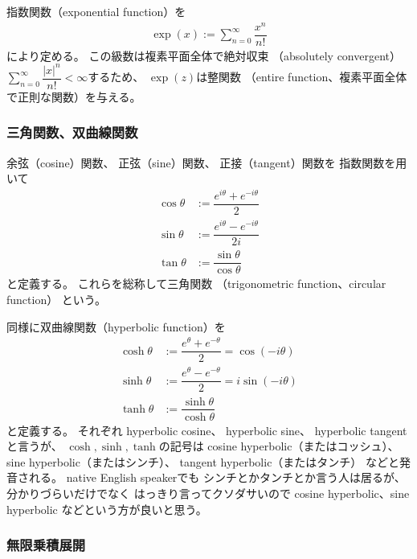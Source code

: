 指数関数（exponential function）を
\begin{align}
    \exp(x)
    :=
    \sum_{n=0}^\infty
    \dfrac{x^n}{n!}
\end{align}
により定める。
この級数は複素平面全体で絶対収束
（absolutely convergent）
$\displaystyle
\sum_{n=0}^\infty
\dfrac{|x|^n}{n!}
< \infty
$するため、
$\exp(z)$は整関数
（entire function、複素平面全体で正則な関数）を与える。

\subsubsection{三角関数、双曲線関数}

余弦（cosine）関数、
正弦（sine）関数、
正接（tangent）関数を
指数関数を用いて
\begin{subequations}
\begin{align}
    \cos\theta &:= \dfrac{e^{i\theta} + e^{-i\theta}}{2}
\\
    \sin\theta &:= \dfrac{e^{i\theta} - e^{-i\theta}}{2i}
\\
    \tan\theta &:= \dfrac{\sin\theta}{\cos\theta}
\end{align}
\end{subequations}
と定義する。
これらを総称して三角関数
（trigonometric function、circular function）
という。

同様に双曲線関数（hyperbolic function）を
\begin{subequations}
\begin{align}
    \cosh\theta
    &:=
    \dfrac{e^{\theta} + e^{-\theta}}{2}
    =
    \cos(-i\theta)
\\
    \sinh\theta
    &:=
    \dfrac{e^{\theta} - e^{-\theta}}{2}
    =
    i\sin(-i\theta)
\\
    \tanh\theta
    &:=
    \dfrac{\sinh\theta}{\cosh\theta}
\end{align}
\end{subequations}
と定義する。
それぞれ
hyperbolic cosine、
hyperbolic sine、
hyperbolic tangentと言うが、
$\cosh, \sinh, \tanh$の記号は
cosine hyperbolic（またはコッシュ）、
sine hyperbolic（またはシンチ）、
tangent hyperbolic（またはタンチ）
などと発音される。
native English speakerでも
シンチとかタンチとか言う人は居るが、
分かりづらいだけでなく
はっきり言ってクソダサいので
cosine hyperbolic、sine hyperbolic
などという方が良いと思う。

\subsubsection{無限乗積展開}

